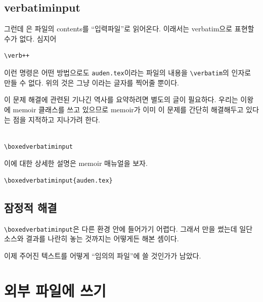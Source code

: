 \subsection{verbatiminput}

그런데 \verb||은 파일의 contents를 “입력파일”로 읽어온다. 이래서는 verbatim으로
표현할 수가 없다. 심지어
\begin{verbatim}
\verb++
\end{verbatim}
이런 명령은 어떤 방법으로도 \verb|auden.tex|이라는 파일의 내용을 \verb|\verbatim|의
인자로 만들 수 없다. 위의 것은 그냥 \verb||이라는 글자를 찍어줄 뿐이다.

이 문제 해결에 관련된 기나긴 역사를 요약하려면 별도의 글이 필요하다. 우리는 이왕에 memoir 
클래스를 쓰고 있으므로 memoir가 이미 이 문제를 간단히 해결해두고 있다는 점을 지적하고 지나가려 한다.

\begin{verbatim}

\boxedverbatiminput
\end{verbatim}

이에 대한 상세한 설명은 memoir 매뉴얼을 보자.

\begin{verbatim}
\boxedverbatiminput{auden.tex}
\end{verbatim}


\subsection{잠정적 해결}

\begin{examplebelow}
\ifvmode\leavevmode\fi
\begin{minipage}{.5\textwidth}

\end{minipage}
\begin{minipage}{.45\textwidth}

\end{minipage}
\end{examplebelow}

\verb|\boxedverbatiminput|은 다른 환경 안에 들어가기 어렵다. 그래서 \verb||만을
썼는데 일단 소스와 결과를 나란히 놓는 것까지는 어떻게든 해본 셈이다.

이제 주어진 텍스트를 어떻게 “임의의 파일”에 쓸 것인가가 남았다.

\section{외부 파일에 쓰기}

